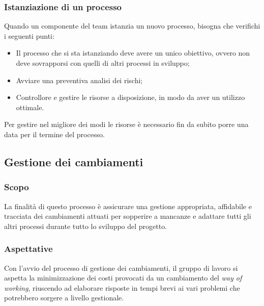\subsubsection{Istanziazione di un processo}
Quando un componente del team istanzia un nuovo processo, bisogna che verifichi i seguenti punti:
\begin{itemize}
    \item Il processo che si sta istanziando deve avere un unico obiettivo,  ovvero non deve sovrapporsi con quelli di altri processi  in sviluppo;
    \item Avviare una preventiva analisi dei rischi;
    \item Controllore e gestire le risorse a disposizione, in modo da aver un utilizzo ottimale.
\end{itemize}
Per gestire nel migliore dei modi le risorse è necessario fin da subito porre una data per il termine del processo.

\subsection{Gestione dei cambiamenti} \label{_gestioneDeiCambiamenti}
\subsubsection{Scopo}
La finalità di questo processo è assicurare una gestione appropriata, affidabile e tracciata
dei cambiamenti attuati per sopperire a mancanze e adattare tutti gli altri processi durante tutto lo sviluppo del progetto.

\subsubsection{Aspettative}
Con l'avvio del processo di gestione dei cambiamenti, il gruppo di lavoro si aspetta la minimizzazione dei costi provocati da un cambiamento
del \textit{way of working}, riuscendo ad elaborare risposte in tempi brevi ai vari problemi che potrebbero sorgere a livello gestionale.

